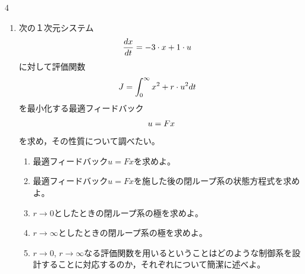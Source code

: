 \documentclass[fleqn]{article}
\begin{document}
\begin{multicols}{4}
\begin{enumerate}
\item
次の１次元システム
\vspace{-1mm}
\begin{align}
	\frac{dx}{dt} &= -3 \cdot x + 1 \cdot u
\nonumber
\vspace{-4mm}
\end{align}
に対して評価関数
\vspace{-1mm}
\begin{align}
	J &= \int_0^\infty  x^2 + r \cdot u^2 dt
\nonumber
\vspace{-4mm}
\end{align}
を最小化する最適フィードバック
\vspace{-1mm}
\begin{align}
	u=Fx
\nonumber
\vspace{-4mm}
\end{align}
を求め，その性質について調べたい。
\vspace{-2mm}

\begin{enumerate}

\item
最適フィードバック$u=Fx$を求めよ。
\vspace{20cm}

\vfill\null
\columnbreak

\item
最適フィードバック$u=Fx$を施した後の閉ループ系の状態方程式を求めよ。
\vspace{6cm}


\item
$r \rightarrow 0$としたときの閉ループ系の極を求めよ。
\vspace{3cm}

\item
$r \rightarrow \infty$としたときの閉ループ系の極を求めよ。
\vspace{3cm}

\item
$r \rightarrow 0$, $r \rightarrow \infty$なる評価関数を用いるということはどのような制御系を設計することに対応するのか，それぞれについて簡潔に述べよ。
\vspace{4cm}

\end{enumerate}




\end{enumerate}
\end{multicols}
\end{document}
